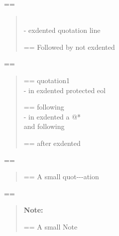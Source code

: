\documentclass{book}
\makeatletter
\newenvironment{Texinfopreformatted}{%
  \par\GNUTobeylines\obeyspaces\frenchspacing\parskip=\z@\parindent=\z@}{}
{\catcode`\^^M=13 \gdef\GNUTobeylines{\catcode`\^^M=13 \def^^M{\null\par}}}
\newenvironment{Texinfoindented}{\begin{list}{}{}\item\relax}{\end{list}}
\renewcommand{\_}{\Texinfounderscore\discretionary{}{}{}}
\makeatother
\begin{document}
\begin{Texinfoindented}
\begin{Texinfopreformatted}%
\ttfamily 
\end{Texinfopreformatted}
\begin{quote}
\leavevmode{}\\
\hbox{\kern -\leftmargin}%
exdented quotation line
\\
\begin{Texinfopreformatted}%
\ttfamily Followed by not exdented 
\end{Texinfopreformatted}
\end{quote}
\begin{Texinfopreformatted}%
\ttfamily 
\end{Texinfopreformatted}
\begin{quote}
\begin{Texinfopreformatted}%
\ttfamily quotation1
\end{Texinfopreformatted}
\leavevmode{}\\
\hbox{\kern -\leftmargin}%
in exdented protected eol \ {}
\\
\begin{Texinfopreformatted}%
\ttfamily following
\end{Texinfopreformatted}
\leavevmode{}\\
\hbox{\kern -\leftmargin}%
in exdented a @* \leavevmode{}\\ and following
\\
\begin{Texinfopreformatted}%
\ttfamily after exdented
\end{Texinfopreformatted}
\end{quote}
\begin{Texinfopreformatted}%
\ttfamily 
\end{Texinfopreformatted}
\begin{quote}
\begin{footnotesize}
\begin{Texinfopreformatted}%
\ttfamily A small quot{-}{-}{-}ation
\end{Texinfopreformatted}
\end{footnotesize}
\end{quote}
\begin{Texinfopreformatted}%
\ttfamily 
\end{Texinfopreformatted}
\begin{quote}
\begin{footnotesize}
\textbf{Note:} \begin{Texinfopreformatted}%
\ttfamily A small Note
\end{Texinfopreformatted}

\end{footnotesize}
\end{quote}
\end{Texinfoindented}
\end{document}
